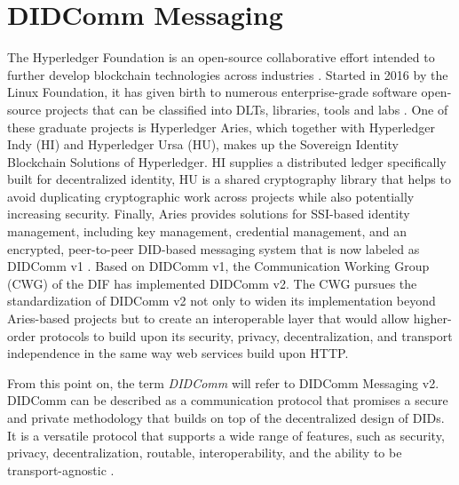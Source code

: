 









\section{DIDComm Messaging}\label{section:didcomm}

The Hyperledger Foundation is an open-source collaborative effort intended to further develop blockchain technologies across industries \cite{jones_boswell_2022}. Started in 2016 by the Linux Foundation, it has given birth to numerous enterprise-grade software open-source projects that can be classified into DLTs, libraries, tools and labs \cite{lusard_lehors_muscara_boswell_zsigri_2021}. One of these graduate projects is Hyperledger Aries, which together with Hyperledger Indy (HI) and Hyperledger Ursa (HU), makes up the Sovereign Identity Blockchain Solutions of Hyperledger. HI supplies a distributed ledger specifically built for decentralized identity, HU is a shared cryptography library that helps to avoid duplicating cryptographic work across projects while also potentially increasing security. Finally, Aries provides solutions for SSI-based identity management, including key management, credential management, and an encrypted, peer-to-peer DID-based messaging system that is now labeled as DIDComm v1 \cite{jones_boswell_2022}. 
Based on DIDComm v1, the Communication Working Group (CWG) of the DIF has implemented DIDComm v2. The CWG pursues the standardization of DIDComm v2 not only to widen its implementation beyond Aries-based projects but to create an interoperable layer that would allow higher-order protocols to build upon its security, privacy, decentralization, and transport independence in the same way web services build upon HTTP. \cite{young_2020} \cite{curren_looker_terbu_2020}

From this point on, the term \emph{DIDComm} will refer to DIDComm Messaging v2. DIDComm can be described as a communication protocol that promises a secure and private methodology that builds on top of the decentralized design of DIDs. It is a versatile protocol that supports a wide range of features, such as security, privacy, decentralization, routable, interoperability, and the ability to be transport-agnostic \cite{curren_looker_terbu_2020}.


